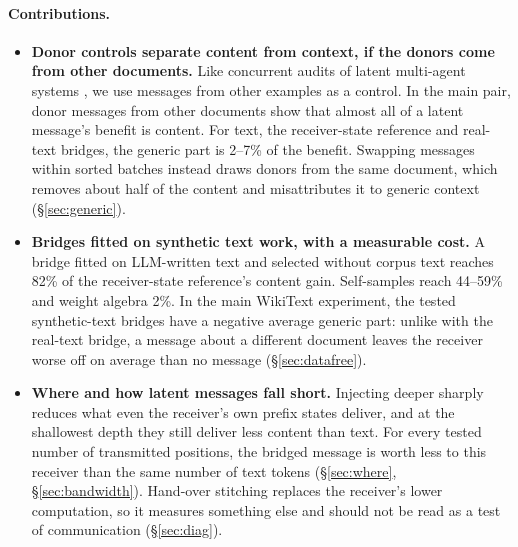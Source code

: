 \paragraph{Contributions.}
\begin{itemize}
\item \textbf{Donor controls separate content from context, if the donors come from other documents.} Like concurrent audits of latent multi-agent systems \citep{zhang2026latentchannelsactuallycommunicate,cheng2026doeslatentcommunicationpay}, we use messages from other examples as a control. In the main pair, donor messages from other documents show that almost all of a latent message's benefit is content. For text, the receiver-state reference and real-text bridges, the generic part is 2--7\% of the benefit. Swapping messages within sorted batches instead draws donors from the same document, which removes about half of the content and misattributes it to generic context (\S\ref{sec:generic}).
\item \textbf{Bridges fitted on synthetic text work, with a measurable cost.} A bridge fitted on LLM-written text and selected without corpus text reaches 82\% of the receiver-state reference's content gain. Self-samples reach 44--59\% and weight algebra 2\%. In the main WikiText experiment, the tested synthetic-text bridges have a negative average generic part: unlike with the real-text bridge, a message about a different document leaves the receiver worse off on average than no message (\S\ref{sec:datafree}). \SCALECONTRIB
\item \textbf{Where and how latent messages fall short.} Injecting deeper sharply reduces what even the receiver's own prefix states deliver, and at the shallowest depth they still deliver less content than text. For every tested number of transmitted positions, the bridged message is worth less to this receiver than the same number of text tokens (\S\ref{sec:where}, \S\ref{sec:bandwidth}). Hand-over stitching replaces the receiver's lower computation, so it measures something else and should not be read as a test of communication (\S\ref{sec:diag}).
\end{itemize}
